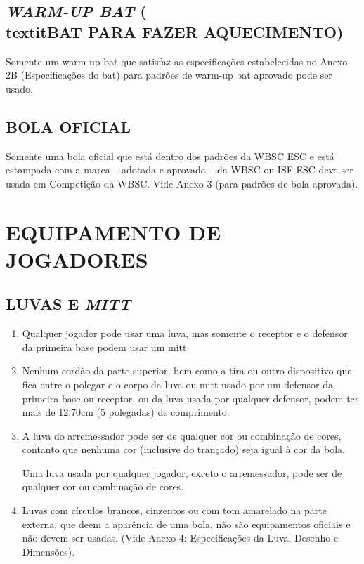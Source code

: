 \subsection{\textit{WARM-UP BAT} (\\textit{BAT} PARA FAZER AQUECIMENTO)}
 Somente um \gls{warm-up bat} que satisfaz as especificações estabelecidas no Anexo 2B (Especificações do \gls{bat}) para padrões de \gls{warm-up bat} aprovado pode ser usado.

\subsection{BOLA OFICIAL}
 Somente uma bola oficial que está dentro dos padrões da WBSC \gls{ESC} e está estampada com a marca -- adotada e aprovada -- da WBSC ou ISF \gls{ESC} deve ser usada em Competição da WBSC. Vide Anexo 3 (para padrões de bola aprovada).

\section{EQUIPAMENTO DE JOGADORES}

\subsection{LUVAS E \textit{MITT}}

\begin{enumerate}[label=(\alph*)]\item   Qualquer jogador pode usar uma luva, mas somente o receptor e o defensor  da primeira base podem usar um \gls{mitt}.
\item  Nenhum cordão da parte superior, bem como a tira ou outro dispositivo que  fica entre o polegar e o corpo da luva ou \gls{mitt} usado por um defensor da primeira   base ou receptor, ou da luva usada por qualquer defensor, podem ter mais de  12,70cm (5 polegadas) de comprimento.
\item  A luva do arremessador pode ser de qualquer cor ou combinação de cores, contanto que nenhuma cor (inclusive do trançado) seja igual à cor da bola.

 Uma  luva usada por qualquer jogador, exceto o arremessador, pode ser de qualquer cor ou combinação de cores.

\item  Luvas com círculos brancos, cinzentos ou com tom amarelado na parte externa, que deem a aparência de uma bola, não são equipamentos oficiais e não devem ser usadas. (Vide Anexo 4: Especificações da Luva, Desenho e Dimensões).
\end{enumerate}


